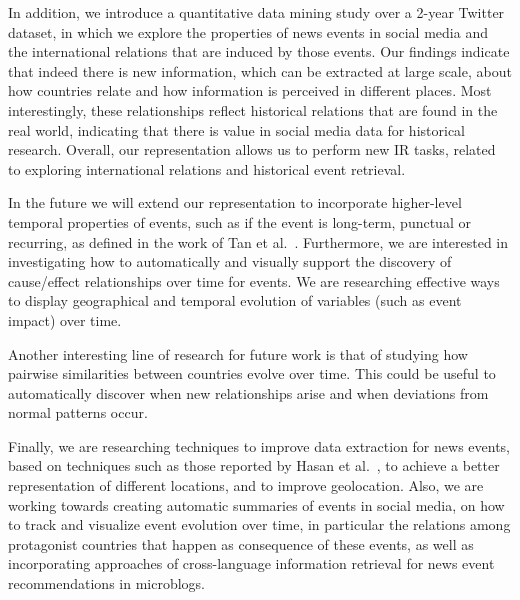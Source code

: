 In addition, we introduce a quantitative data mining study over a 2-year Twitter
dataset, in which we explore the properties of news events in social media
and the international relations that are induced by those events.  Our
findings indicate that indeed there is new information, which can be
extracted at large scale, about how countries relate and how information is
perceived in different places.  Most interestingly, these relationships
reflect historical relations that are found in the real world, indicating
that there is value in social media data for historical research.
%
Overall, our representation allows us to perform new IR tasks, related to exploring
international relations and historical event retrieval.

In the future we will extend our representation to incorporate higher-level
temporal properties of events, such as if the event is long-term, punctual
or recurring, as defined in the work of Tan et al.~\cite{st-model_2009}.
Furthermore, we are interested in investigating how to automatically
and visually support the discovery of cause/effect relationships
over time for events.
We are researching effective ways to display geographical and temporal
evolution of variables (such as event impact) over time.

Another interesting line of research for future work is that of studying how
pairwise similarities between countries evolve over time. This could be
useful to automatically discover when new relationships arise and when
deviations from normal patterns occur.

Finally, we are researching techniques to improve data
extraction for news events, based on techniques such as those reported by
Hasan et al.~\cite{doi:10.1177/0165551517698564}, to achieve a better representation
of different locations, and to improve geolocation.
Also, we are working towards
creating automatic summaries of events in social media, on how to track and
visualize event evolution over time, in particular the relations among
protagonist countries that happen as consequence of these
events, as well as incorporating approaches of
cross-language information retrieval\cite{grefenstette2012cross} for news
event recommendations in microblogs.